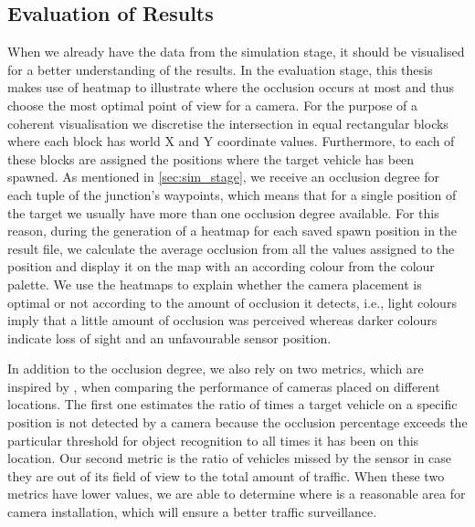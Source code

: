 \subsection{Evaluation of Results}
When we already have the data from the simulation stage, it should be visualised for a better understanding of the results. In the evaluation stage, this thesis makes use of heatmap to illustrate where the occlusion occurs at most and thus choose the most optimal point of view for a camera. For the purpose of a coherent visualisation we discretise the intersection in equal rectangular blocks where each block has world X and Y coordinate values. Furthermore, to each of these blocks are assigned the positions where the target vehicle has been spawned. As mentioned in \ref{sec:sim_stage}, we receive an occlusion degree for each tuple of the junction's waypoints, which means that for a single position of the target we usually have more than one occlusion degree available. For this reason, during the generation of a heatmap for each saved spawn position in the result file, we calculate the average occlusion from all the values assigned to the position and display it on the map with an according colour from the colour palette. We use the heatmaps to explain whether the camera placement is optimal or not according to the amount of occlusion it detects, i.e., light colours imply that a little amount of occlusion was perceived whereas darker colours indicate loss of sight and an unfavourable sensor position.

In addition to the occlusion degree, we also rely on two metrics, which are inspired by \cite{occlusion_degree_model}, when comparing the performance of cameras placed on different locations. The first one estimates the ratio of times a target vehicle on a specific position is not detected by a camera because the occlusion percentage exceeds the particular threshold for object recognition to all times it has been on this location. Our second metric is the ratio of vehicles missed by the sensor in case they are out of its field of view to the total amount of traffic. When these two metrics have lower values, we are able to determine where is a reasonable area for camera installation, which will ensure a better traffic surveillance. 

